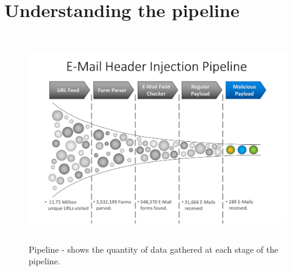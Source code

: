 \section[The Pipeline]{Understanding the pipeline}
\begin{figure}
	\centering
	\includegraphics[width=16cm, height=9cm]{Results/emailheaderpipeline}
	\caption[E-Mail header injection Pipeline]{Pipeline - shows the quantity of data gathered at each stage of the pipeline.}
	\label{fig:pipeline}
\end{figure}